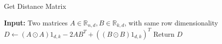 \begin{algorithm}[H]
\caption{Get Distance Matrix}
\begin{algorithmic}[1]
	\State \textbf{Input:} Two matrices $A\in\mathbb{R}_{n,d},B\in\mathbb{R}_{k,d}$, with same row dimensionality
    \State $D \gets (A\odot A)1_{d,k}-2AB^{T}+((B\odot B)1_{d,k})^{T}$ 
    \State Return $D$ 
\end{algorithmic}
\end{algorithm}